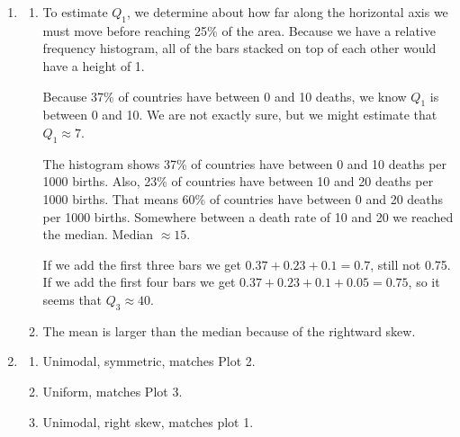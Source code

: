 \documentclass[12pt,letterpaper]{article}
\begin{document}
\begin{enumerate}
\item \begin{enumerate}\item To estimate $Q_1$, we determine about how far along the horizontal axis we must move before reaching 25\% of the area. Because we have a relative frequency histogram, all of the bars stacked on top of each other would have a height of 1.

Because 37\% of countries have between 0 and 10 deaths, we know $Q_1$ is between 0 and 10. We are not exactly sure, but we might estimate that $Q_1 \approx 7$. 

The histogram shows 37\% of countries have between 0 and 10 deaths per 1000 births. Also, 23\% of countries have between 10 and 20 deaths per 1000 births. That means 60\% of countries have between 0 and 20 deaths per 1000 births. Somewhere between a death rate of 10 and 20 we reached the median. Median $\approx 15$.

If we add the first three bars we get $0.37+0.23+0.1 = 0.7$, still not 0.75. If we add the first four bars we get $0.37+0.23+0.1+0.05 = 0.75$, so it seems that $Q_3 \approx 40$.

\item The mean is larger than the median because of the rightward skew.
\end{enumerate}


\item \begin{enumerate}
\item Unimodal, symmetric, matches Plot 2.
\item Uniform, matches Plot 3.
\item Unimodal, right skew, matches plot 1.
\end{enumerate}


\end{enumerate}
\end{document}
